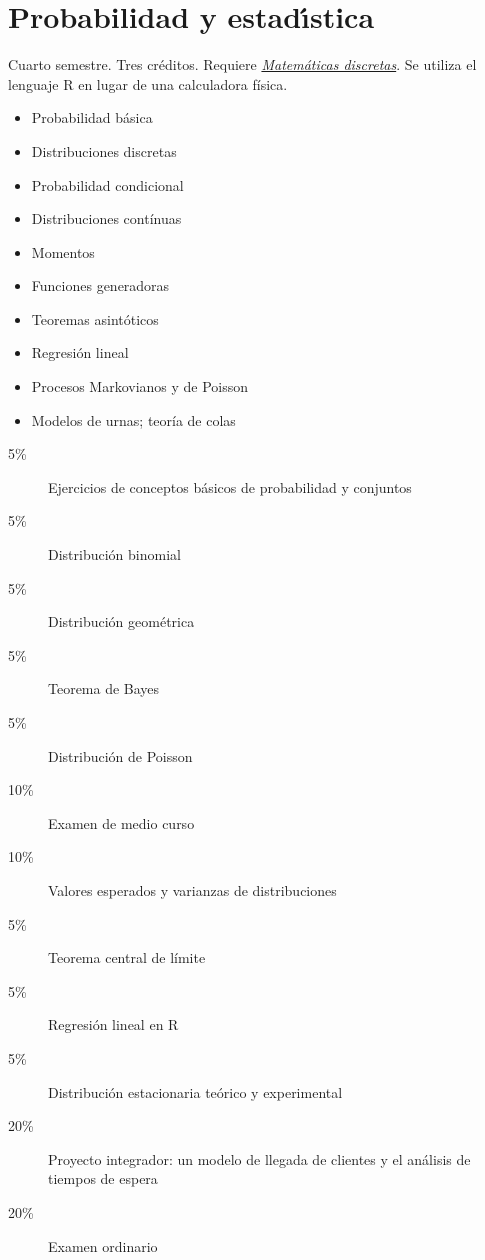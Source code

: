 \documentclass{article}
\begin{document}
\begin{multicols}{4}
\newpage

\hypertarget{pye}{\section*{Probabilidad y estad\'{\i}stica }}

Cuarto semestre. Tres cr\'{e}ditos. Requiere \hyperlink{md}{\em
  Matem\'{a}ticas discretas}. Se utiliza el lenguaje R en lugar de una
calculadora f\'{i}sica.

\begin{itemize}
\item{Probabilidad b\'{a}sica}
\item{Distribuciones discretas}
\item{Probabilidad condicional}
\item{Distribuciones cont\'{i}nuas}
\item{Momentos}
\item{Funciones generadoras}
\item{Teoremas asint\'{o}ticos}
\item{Regresi\'{o}n lineal}
\item{Procesos Markovianos y de Poisson}    
\item{Modelos de urnas; teor\'{i}a de colas}  
\end{itemize}

\begin{description}
\item[5\%]{Ejercicios de conceptos b\'{a}sicos de probabilidad y conjuntos}
\item[5\%]{Distribuci\'{o}n binomial}
\item[5\%]{Distribuci\'{o}n geom\'{e}trica}  
\item[5\%]{Teorema de Bayes}
\item[5\%]{Distribuci\'{o}n de Poisson}
\item[10\%]{Examen de medio curso}
\item[10\%]{Valores esperados y varianzas de distribuciones}
\item[5\%]{Teorema central de l\'{i}mite}
\item[5\%]{Regresi\'{o}n lineal en R}
\item[5\%]{Distribuci\'{o}n estacionaria te\'{o}rico y experimental}
\item[20\%]{Proyecto integrador: un modelo de llegada de clientes y el
  an\'{a}lisis de tiempos de espera}
\item[20\%]{Examen ordinario}    
\end{description}


\end{multicols}
\end{document}
